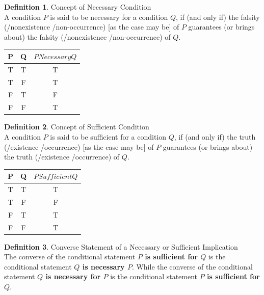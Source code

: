 \documentclass{book}
\theoremstyle{definition}
\newtheorem{definition}{Definition}[section]
\theoremstyle{remark}
\begin{document}
\begin{definition}
Concept of Necessary Condition \\
A condition $P$ is said to be necessary for a condition $Q$, if (and only if) the falsity (/nonexistence /non-occurrence) [as the case may be] of $P$ guarantees (or brings about) the falsity (/nonexistence /non-occurrence) of $Q$. \\

\begin{center}
\begin{tabular}{|c|c|c|}
\hline 
P & Q & $P Necessary Q$ \\ 
\hline 
T & T & T \\ 
\hline 
T & F & T \\ 
\hline 
F & T & F \\ 
\hline 
F & F & T \\ 
\hline 
\end{tabular} 
\end{center}

\end{definition}

\begin{definition}
Concept of Sufficient Condition \\
A condition $P$ is said to be sufficient for a condition $Q$, if (and only if) the truth (/existence /occurrence) [as the case may be] of $P$ guarantees (or brings about) the truth (/existence /occurrence) of $Q$.

\begin{center}
\begin{tabular}{|c|c|c|}
\hline 
P & Q & $P Sufficient Q$ \\ 
\hline 
T & T & T \\ 
\hline 
T & F & F \\ 
\hline 
F & T & T \\ 
\hline 
F & F & T \\ 
\hline 
\end{tabular} 
\end{center}
\end{definition}


\begin{definition}
Converse Statement of a Necessary or Sufficient Implication \\

The converse of the conditional statement {\bf $P$ is sufficient for $Q$} is the conditional statement {\bf $Q$ is necessary $P$}. While the converse of the conditional statement {\bf $Q$ is necessary for $P$} is the conditional statement {\bf $P$ is sufficient for $Q$}.
\end{definition}
\end{document}
